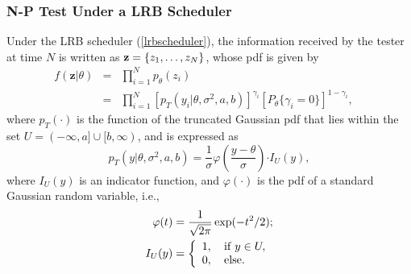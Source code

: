 \documentclass[journal]{IEEEtran}
\def\beq{\begin{eqnarray}}
\def\enq{\end{eqnarray}}
\begin{document}
\subsubsection{N-P Test Under a LRB Scheduler}
Under the LRB scheduler (\ref{lrbscheduler}), the information received by the tester at time $N$ is written as  ${\bf{z}} = \{ {z_1}, \ldots ,{z_N}\}$, whose pdf  is given by
\beq
\label{pdf}
f(\textbf{z}|\theta)&=&\prod\limits_{i = 1}^N {{p_\theta }({z_i})} \nonumber\\
& =& \prod\limits_{i = 1}^N {{{\left[{{p_{T}}({y_i}|\theta ,\sigma^2 ,a,b)}  \right]}^{{\gamma _i}}}{{\left[ {{P}_\theta\{ {\gamma _i} = 0\} } \right]}^{1 - {\gamma _i}}}},\quad
\enq
where $p_{T}(\cdot)$ is the function of the truncated Gaussian pdf that lies within the set $U= ( - \infty ,a] \cup [b,\infty )$, and is  expressed as
\begin{equation}
\label{pT}
{p_{T}}({y}|\theta ,\sigma^2 ,a,b) = {{\frac{1}{\sigma }\varphi \left(\frac{{{y} - \theta }}{\sigma }\right)}}{ \cdot I_{U}(y)},
\end{equation}
where $I_{U}(y)$ is an indicator function, and $\varphi(\cdot)$ is the pdf of a standard Gaussian random variable, i.e.,
\begin{equation*}
\begin{split}
\varphi(t)&=\frac{1}{\sqrt{2\pi}}\exp(-t^{2}/2);\\
{I_U}(y) &= \left\{ \begin{array}{l}
1,{\quad\rm{ if}}\; y \in U,\\
0,{\quad\rm{ else}}.
\end{array} \right.
\end{split}
\end{equation*}
\end{document}
